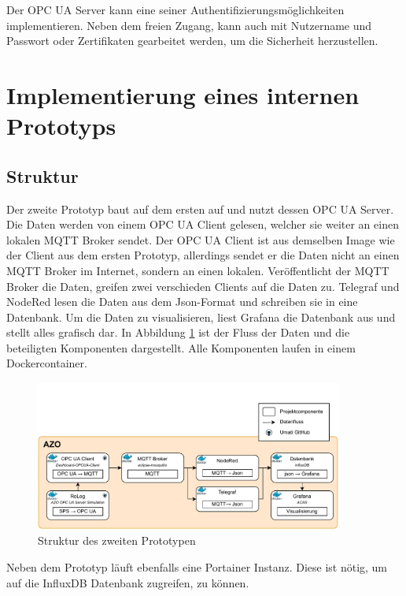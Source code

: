 \documentclass[a4paper, 12pt, oneside, toc=listofnumbered, bibliography=totoc]{scrbook}
\begin{document}
		Der OPC UA Server kann eine seiner Authentifizierungsmöglichkeiten implementieren. Neben dem freien Zugang, kann auch mit Nutzername und Passwort oder Zertifikaten gearbeitet werden, um die Sicherheit herzustellen. 
	
	\section{Implementierung eines internen Prototyps}\label{ch:Implementierung-Intern}
	
		\subsection{Struktur}
		
		Der zweite Prototyp baut auf dem ersten auf und nutzt dessen OPC UA Server. Die Daten werden von einem OPC UA Client gelesen, welcher sie weiter an einen lokalen MQTT Broker sendet. Der OPC UA Client ist aus demselben Image wie der Client aus dem ersten Prototyp, allerdings sendet er die Daten nicht an einen MQTT Broker im Internet, sondern an einen lokalen. Veröffentlicht der MQTT Broker die Daten, greifen zwei verschieden Clients auf die Daten zu. Telegraf und NodeRed lesen die Daten aus dem Json-Format und schreiben sie in eine Datenbank. Um die Daten zu visualisieren, liest Grafana die Datenbank aus und stellt alles grafisch dar. In Abbildung \ref{fig:Prototyp2} ist der Fluss der Daten und die beteiligten Komponenten dargestellt. Alle Komponenten laufen in einem Dockercontainer.
		
		\begin{figure}[H]
			\centering
			\includegraphics[width=0.9\textwidth]{res/implementierung/Prototyp-Prototyp.pdf}
			\caption{Struktur des zweiten Prototypen}
			\label{fig:Prototyp2}
		\end{figure}
		
		Neben dem Prototyp läuft ebenfalls eine Portainer Instanz. Diese ist nötig, um auf die InfluxDB Datenbank zugreifen, zu können. 
		
\end{document}
